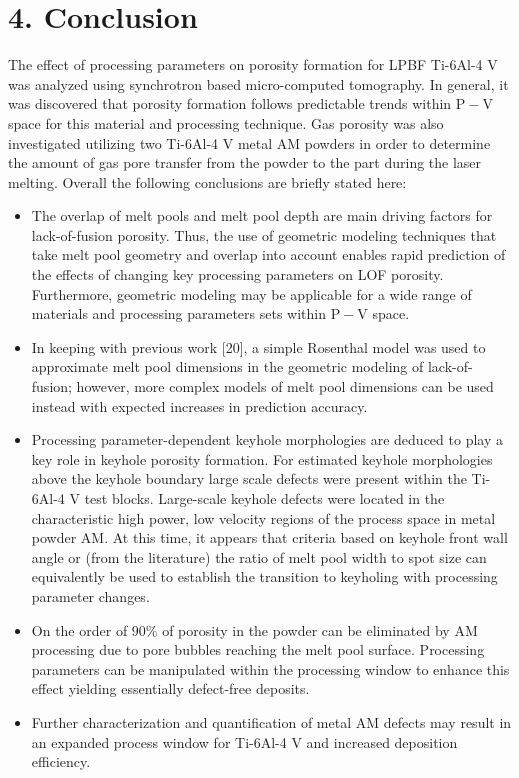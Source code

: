 \documentclass[10pt]{article}
\begin{document}
\section*{4. Conclusion}
The effect of processing parameters on porosity formation for LPBF Ti-6Al-4 V was analyzed using synchrotron based micro-computed tomography. In general, it was discovered that porosity formation follows predictable trends within $\mathrm{P}-\mathrm{V}$ space for this material and processing technique. Gas porosity was also investigated utilizing two Ti-6Al-4 V metal AM powders in order to determine the amount of gas pore transfer from the powder to the part during the laser melting. Overall the following conclusions are briefly stated here:

\begin{itemize}
  \item The overlap of melt pools and melt pool depth are main driving factors for lack-of-fusion porosity. Thus, the use of geometric modeling techniques that take melt pool geometry and overlap into account enables rapid prediction of the effects of changing key processing parameters on LOF porosity. Furthermore, geometric modeling may be applicable for a wide range of materials and processing parameters sets within $\mathrm{P}-\mathrm{V}$ space.
  \item In keeping with previous work [20], a simple Rosenthal model was used to approximate melt pool dimensions in the geometric modeling of lack-of-fusion; however, more complex models of melt pool dimensions can be used instead with expected increases in prediction accuracy.
  \item Processing parameter-dependent keyhole morphologies are deduced to play a key role in keyhole porosity formation. For estimated keyhole morphologies above the keyhole boundary large scale defects were present within the Ti-6Al-4 V test blocks. Large-scale keyhole defects were located in the characteristic high power, low velocity regions of the process space in metal powder AM. At this time, it appears that criteria based on keyhole front wall angle or (from the literature) the ratio of melt pool width to spot size can equivalently be used to establish the transition to keyholing with processing parameter changes.
  \item On the order of $90 \%$ of porosity in the powder can be eliminated by AM processing due to pore bubbles reaching the melt pool surface. Processing parameters can be manipulated within the processing window to enhance this effect yielding essentially defect-free deposits.
  \item Further characterization and quantification of metal AM defects may result in an expanded process window for Ti-6Al-4 V and increased deposition efficiency.
\end{itemize}
\end{document}
